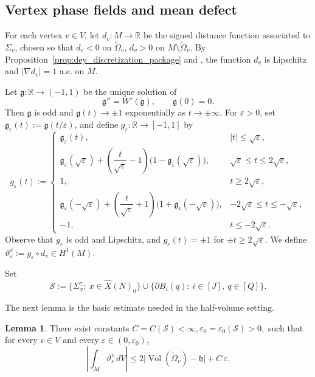 \documentclass[12pt,english]{article}
\theoremstyle{definition}
\newtheorem{lemma}[theorem]{Lemma}
\begin{document}
\subsection{Vertex phase fields and mean defect}

For each vertex $v\in V$, let $d_v:M\to\mathbb{R}$ be the signed distance function associated to $\Sigma_v$, chosen so that $d_v<0$ on $\widetilde\Omega_v$, $d_v>0$ on $M\setminus \widetilde\Omega_v$. By Proposition~\ref{prop:dey_discretization_package} and \cite[Proposition~9.1]{Gua18}, the function $d_v$ is Lipschitz and $|\nabla d_v|=1$ a.e. on $M$.

Let $\mathfrak g:\mathbb{R}\to(-1,1)$ be the unique solution of
\[
\mathfrak g''=W'(\mathfrak g),
\qquad
\mathfrak g(0)=0.
\]
Then $\mathfrak g$ is odd and $\mathfrak g(t)\to \pm 1$ exponentially as $t\to\pm\infty$. For $\varepsilon>0$, set $\mathfrak g_\varepsilon(t):=\mathfrak g(t/\varepsilon)$,
and define $g_\varepsilon:\mathbb{R}\to[-1,1]$ by
\[
g_\varepsilon(t):=
\begin{cases}
\mathfrak g_\varepsilon(t), & |t|\le \sqrt{\varepsilon},\\[0.5ex]
\mathfrak g_\varepsilon(\sqrt{\varepsilon})+\left(\dfrac{t}{\sqrt{\varepsilon}}-1\right)\bigl(1-\mathfrak g_\varepsilon(\sqrt{\varepsilon})\bigr),
& \sqrt{\varepsilon}\le t\le 2\sqrt{\varepsilon},\\[1.5ex]
1, & t\ge 2\sqrt{\varepsilon},\\[0.5ex]
\mathfrak g_\varepsilon(-\sqrt{\varepsilon})+\left(\dfrac{t}{\sqrt{\varepsilon}}+1\right)\bigl(1+\mathfrak g_\varepsilon(-\sqrt{\varepsilon})\bigr),
& -2\sqrt{\varepsilon}\le t\le -\sqrt{\varepsilon},\\[1.5ex]
-1, & t\le -2\sqrt{\varepsilon}.
\end{cases}
\]
Observe that $g_\varepsilon$ is odd and Lipschitz, and $g_\varepsilon(t)=\pm 1$ for $\pm t\ge 2\sqrt{\varepsilon}$.
We define $\vartheta_\varepsilon^v:=g_\varepsilon\circ d_v\in H^1(M)$.

Set
\[
\mathscr S:=
\{\Sigma_x^\gamma:\ x\in \widehat X(N)_0\}
\cup
\{\partial B_i(q):\ i\in[J],\ q\in[Q]\}.
\]

The next lemma is the basic estimate needed in the half-volume setting.

\begin{lemma}\label{lem:vertex_mean_defect}
There exist constants $C=C(\mathscr S)<\infty, \varepsilon_0=\varepsilon_0(\mathscr S)>0,$
such that for every $v\in V$ and every $\varepsilon\in(0,\varepsilon_0)$,
\[
\left|\int_M \vartheta_\varepsilon^v\,dV\right|
\le
2\bigl|\operatorname{Vol}(\widetilde\Omega_v)-\mathfrak h\bigr|
+
C\,\varepsilon.
\]
\end{lemma}
\end{document}
